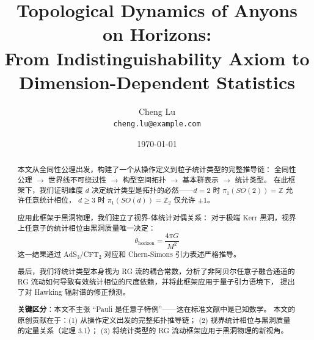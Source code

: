 \documentclass[11pt,a4paper]{article}
\title{Topological Dynamics of Anyons on Horizons:\\
From Indistinguishability Axiom to Dimension-Dependent Statistics}
\author{Cheng Lu\\
\small \texttt{cheng.lu@example.com}}
\date{\today}
\begin{document}
\maketitle

\begin{abstract}
本文从全同性公理出发，构建了一个从操作定义到粒子统计类型的完整推导链：
全同性公理 $\rightarrow$ 世界线不可绕过性 $\rightarrow$ 构型空间拓扑 $\rightarrow$ 基本群表示 $\rightarrow$ 统计类型。
在此框架下，我们证明维度 $d$ 决定统计类型是拓扑的必然——$d=2$ 时 $\pi_1(SO(2))=\mathbb{Z}$ 允许任意统计相位，
$d\geq 3$ 时 $\pi_1(SO(d))=\mathbb{Z}_2$ 仅允许 $\pm 1$。

应用此框架于黑洞物理，我们建立了视界-体统计对偶关系：
对于极端 Kerr 黑洞，视界上任意子的统计相位由黑洞质量唯一决定：
$$\theta_{\text{horizon}} = \frac{4\pi G}{M^2}$$
这一结果通过 AdS$_3$/CFT$_2$ 对应和 Chern-Simons 引力表述严格推导。

最后，我们将统计类型本身视为 RG 流的耦合常数，分析了非阿贝尔任意子融合通道的
RG 流动如何导致有效统计相位的尺度依赖，并将此框架应用于量子引力语境下，
提出了对 Hawking 辐射谱的修正预测。

\textbf{关键区分}：本文不主张 ``Pauli 是任意子特例''——这在标准文献中是已知数学。
本文的原创贡献在于：(1) 从操作定义出发的完整拓扑推导链；
(2) 视界统计相位与黑洞质量的定量关系（定理 3.1）；
(3) 将统计类型的 RG 流动框架应用于黑洞物理的新视角。
\end{abstract}
\end{document}
